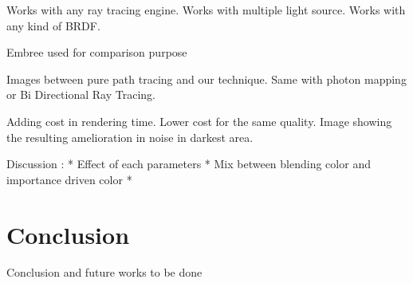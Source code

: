 Works with any ray tracing engine. Works with multiple light source. Works with any kind of BRDF.

Embree used for comparison purpose

Images between pure path tracing and our technique. Same with photon mapping or Bi Directional Ray Tracing. 

Adding cost in rendering time. Lower cost for the same quality. Image showing the resulting amelioration in noise in darkest area.

Discussion : 
* Effect of each parameters
* Mix between blending color and importance driven color
* 

%

\section{Conclusion}

Conclusion and future works to be done






